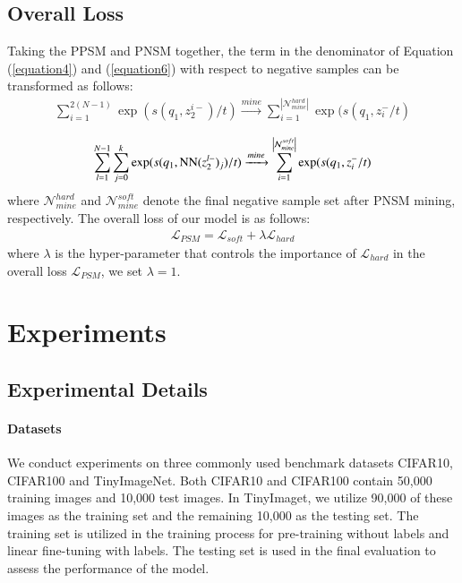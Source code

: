 \documentclass[review]{elsarticle}
\begin{document}
\subsection{Overall Loss}
Taking the PPSM and PNSM together, the term in the denominator of  
 Equation (\ref{equation4}) and (\ref{equation6}) with respect to negative samples can be transformed as follows: 
\begin{equation}
\begin{aligned}
\sum_{i=1}^{2(N-1)}\exp(s( q_1,z_2^{i-})/t ) \xrightarrow{mine}
\sum_{i=1}^{\left |\mathcal{N}_{mine}^{hard}\right |}\exp(s( q_1,z_i^{-}/t )
     \label{equation10}
\end{aligned}
\end{equation}
 
\begin{equation}
\begin{aligned}
\sum_{l=1}^{N-1}\sum_{j=0}^{k}\exp(s( q_1,{\rm NN}(z_2^{l-})_j)/t ) \xrightarrow{mine}
\sum_{i=1}^{\left |\mathcal{N}_{mine}^{soft}\right |}\exp(s( q_1,z_i^{-}/t )
     \label{equation10}
\end{aligned}
\end{equation}where $\mathcal{N}_{mine}^{hard}$ and $\mathcal{N}_{mine}^{soft}$ denote the final negative sample set after PNSM mining, respectively. The overall loss of our model is as follows:
\begin{equation}
\begin{aligned}
\mathcal{L} _{PSM}= 
\mathcal{L} _{soft}+\lambda \mathcal{L} _{hard}
     \label{equation7}
\end{aligned}
\end{equation}
where $\lambda$ is the hyper-parameter that controls the importance of $\mathcal{L} _{hard}$ in the overall loss $\mathcal{L} _{PSM}$, we set $\lambda =1 $.



\section{Experiments}
\subsection{Experimental Details}
\paragraph{Datasets}
We conduct experiments on three commonly used benchmark datasets CIFAR10\cite{b27}, CIFAR100\cite{b27} and TinyImageNet\cite{b28}. Both CIFAR10 and CIFAR100 contain 50,000 training images and 10,000 test images. In TinyImaget, we utilize 90,000 of these images as the training set and the remaining 10,000 as the testing set. The training set is utilized in the training process for pre-training without labels and linear fine-tuning with labels. The testing set is used in the final evaluation to assess the performance of the model.
\end{document}
